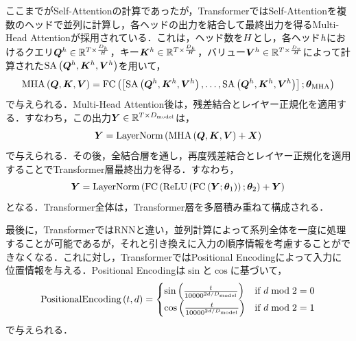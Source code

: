 ここまでがSelf-Attentionの計算であったが，TransformerではSelf-Attentionを複数のヘッドで並列に計算し，各ヘッドの出力を結合して最終出力を得るMulti-Head Attentionが採用されている．これは，ヘッド数を$H$とし，各ヘッド$h$におけるクエリ$\bm{Q}^{h} \in \mathbb{R}^{T \times \frac{D_{k}}{H}}$，キー$\bm{K}^{h} \in \mathbb{R}^{T \times \frac{D_{k}}{H}}$，バリュー$\bm{V}^{h} \in \mathbb{R}^{T \times \frac{D_{v}}{H}}$によって計算された$\text{SA}\left(\bm{Q}^{h}, \bm{K}^{h}, \bm{V}^{h}\right)$を用いて，
\begin{equation}
    \text{MHA}\left(\bm{Q}, \bm{K}, \bm{V}\right) = \text{FC}\left(\left[\text{SA}\left(\bm{Q}^{h}, \bm{K}^{h}, \bm{V}^{h}\right), \ldots, \text{SA}\left(\bm{Q}^{h}, \bm{K}^{h}, \bm{V}^{h}\right)\right]; \bm{\theta}_{\text{MHA}}\right)
\end{equation}
で与えられる．Multi-Head Attention後は，残差結合とレイヤー正規化を適用する．すなわち，この出力$\bm{Y} \in \mathbb{R}^{T \times D_{\text{model}}}$は，
\begin{equation}
    \bm{Y} = \text{LayerNorm}\left(\text{MHA}\left(\bm{Q}, \bm{K}, \bm{V}\right) + \bm{X}\right)
\end{equation}
で与えられる．その後，全結合層を通し，再度残差結合とレイヤー正規化を適用することでTransformer層最終出力を得る．すなわち，
\begin{equation}
    \bm{Y} = \text{LayerNorm}\left(\text{FC}\left(\text{ReLU}\left(\text{FC}\left(\bm{Y}; \bm{\theta}_{1}\right)\right); \bm{\theta}_{2}\right) + \bm{Y}\right)
\end{equation}
となる．Transformer全体は，Transformer層を多層積み重ねて構成される．

最後に，TransformerではRNNと違い，並列計算によって系列全体を一度に処理することが可能であるが，それと引き換えに入力の順序情報を考慮することができなくなる．これに対し，TransformerではPositional Encodingによって入力に位置情報を与える．Positional Encodingは$\sin$と$\cos$に基づいて，
\begin{equation}
    \text{PositionalEncoding}\left(t, d\right) =
    \begin{cases}
        \sin \left(\frac{t}{10000^{2d / D_{\text{model}}}}\right) & \text{if $d \bmod 2 = 0$} \\
        \cos \left(\frac{t}{10000^{2d / D_{\text{model}}}}\right) & \text{if $d \bmod 2 = 1$}
    \end{cases}
\end{equation}
で与えられる．
